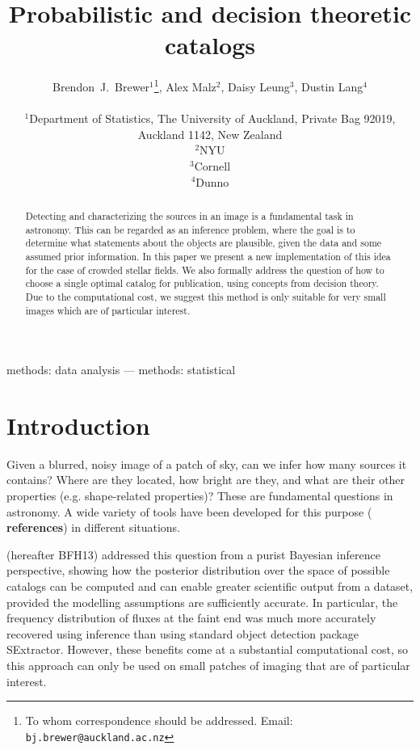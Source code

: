 \documentclass[a4paper,fleqn,usenatbib]{mnras}
\title[]
{Probabilistic and decision theoretic catalogs}
\author[Brewer, Malz, Leung, and Lang]{%
  Brendon~J.~Brewer$^{1}$\thanks{To whom correspondence should be addressed. Email: {\tt bj.brewer@auckland.ac.nz}}, Alex Malz$^2$, Daisy Leung$^3$, Dustin Lang$^4$\\
  \medskip\\
  $^1$Department of Statistics, The University of Auckland, Private Bag 92019,
        Auckland 1142, New Zealand\\
  $^2$NYU\\
  $^3$Cornell\\
  $^4$Dunno}
\date{}
\newcommand{\todo}{\color{red} \bf}
\begin{document}
\label{firstpage}
\pagerange{\pageref{firstpage}--\pageref{lastpage}}
\maketitle

\begin{abstract}
Detecting and characterizing the sources in an image is a fundamental task
in astronomy. This can be regarded as an inference problem, where the goal
is to determine what statements about the objects are plausible, given the
data and some assumed prior information. In this paper we present a new
implementation of this idea for the case of crowded stellar fields.
We also formally address the question of how to choose a single optimal
catalog for publication, using concepts from decision theory.
Due to the computational cost, we suggest this method is only suitable for
very small images which are of particular interest.
\end{abstract}

\begin{keywords}
methods: data analysis --- methods: statistical
\end{keywords}



\section{Introduction}
Given a blurred, noisy image of a patch of sky, can we infer how many
sources it contains? Where are they located, how bright are they,
and what are their other properties (e.g. shape-related properties)? These
are fundamental questions in astronomy. A wide variety of tools have been
developed for this purpose ({\todo references}) in different situations.

\citet{brewer2013probabilistic} (hereafter BFH13)
addressed this question from a purist
Bayesian inference perspective,
showing how the posterior distribution over the space of possible catalogs can be computed and can enable greater scientific output from
a dataset, provided the modelling assumptions are sufficiently accurate. In
particular, the frequency distribution of fluxes at the faint end was much
more accurately recovered using inference than using standard object detection
package SExtractor. However, these benefits come at a substantial computational
cost, so this approach can only be used on small patches of imaging that
are of particular interest.
\end{document}
